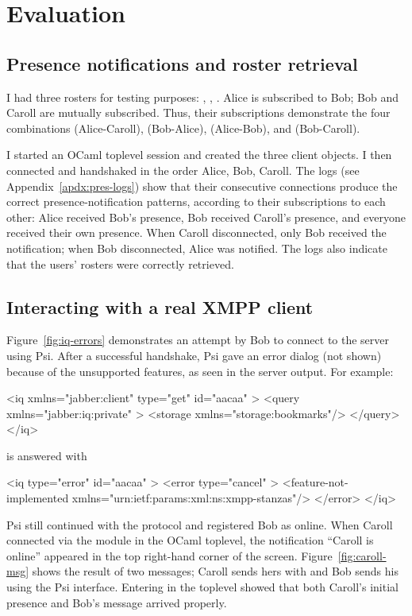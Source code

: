 \chapter{Evaluation}
\section{Presence notifications and roster retrieval}
I had three rosters for testing purposes: , , . Alice is subscribed to Bob; Bob and Caroll are mutually subscribed. Thus, their subscriptions demonstrate the four combinations  (Alice-Caroll),  (Bob-Alice),  (Alice-Bob), and  (Bob-Caroll).

I started an OCaml toplevel session and created the three client objects. I then connected and handshaked in the order Alice, Bob, Caroll.
The logs (see Appendix~\ref{apdx:pres-logs}) show that their consecutive connections produce the correct presence-notification patterns, according to their subscriptions to each other: Alice received Bob's presence, Bob received Caroll's presence, and everyone received their own presence. When Caroll disconnected, only Bob received the notification; when Bob disconnected, Alice was notified. The logs also indicate that the users' rosters were correctly retrieved.

\section{Interacting with a real XMPP client}
Figure~\ref{fig:iq-errors} demonstrates an attempt by Bob to connect to the server using Psi. After a successful handshake, Psi gave an error dialog (not shown) because of the unsupported features, as seen in the server output. For example:

\begin{xml}
<iq xmlns="jabber:client" type="get" id="aacaa" >
  <query xmlns="jabber:iq:private" >
   <storage xmlns="storage:bookmarks"/>
  </query>
</iq>
\end{xml} is answered with
\begin{xml}
<iq type="error" id="aacaa" >
  <error type="cancel" >
    <feature-not-implemented xmlns="urn:ietf:params:xml:ns:xmpp-stanzas"/>
  </error>
</iq>
\end{xml}

Psi still continued with the protocol and registered Bob as online. When Caroll connected via the  module in the OCaml toplevel, the notification ``Caroll is online'' appeared in the top right-hand corner of the screen. Figure~\ref{fig:caroll-msg} shows the result of two messages; Caroll sends hers with  and Bob sends his using the Psi interface. Entering  in the toplevel showed that both Caroll's initial presence and Bob's message arrived properly.

